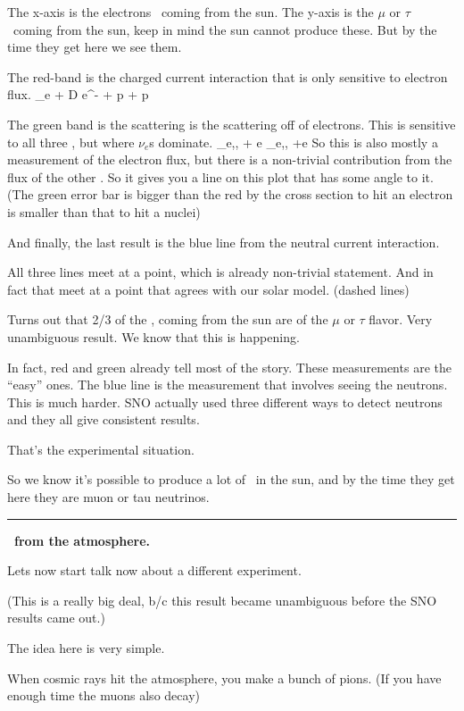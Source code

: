 {The x-axis is the electrons \nus\ coming from the sun. 
The y-axis is the $\mu$ or $\tau$ \nus\ coming from the sun, keep in mind the sun cannot produce these.
But by the time they get here we see them. 

The red-band is the charged current interaction that is only sensitive to electron flux. 
\be
\nu_e + D \rightarrow e^- + p + p
\ee 

The green band is the scattering is the scattering off of electrons.
This is sensitive to all three \nus, but where $\nu_e$s dominate.
\be
\nu_{e,\mu,\tau} + e  \rightarrow \nu_{e,\mu,\tau} +e
\ee
So this is also mostly a measurement of the electron flux, but there is a non-trivial contribution from the flux of the other \nus. 
So it gives you a line on this plot that has some angle to it. 
(The green error bar is bigger than the red by the cross section to hit an electron is smaller than that to hit a nuclei) 

And finally, the last result is the blue line from the neutral current interaction. 

All three lines meet at a point, which is already non-trivial statement. 
And in fact that meet at a point that agrees with our solar model. (dashed lines) 

Turns out that 2/3 of the \nus, coming from the sun are of the $\mu$ or $\tau$ flavor.
Very unambiguous result.
We know that this is happening.

In fact, red and green already tell most of the story. 
These measurements are the ``easy'' ones. 
The blue line is the measurement that involves seeing the neutrons. 
This is much harder. 
SNO actually used three different ways to detect neutrons and they all give consistent results. 

That's the experimental situation. 

So we know it's possible to produce a lot of \nus\ in the sun, and by the time they get here they are muon or tau neutrinos.

\noindent\rule{\textwidth}{1pt}

\textbf{\nus\ from the atmosphere.}

Lets now start talk now about a different experiment. 

(This is a really big deal, b/c this result became unambiguous before the SNO results came out.)

The idea here is very simple. 

When cosmic rays hit the atmosphere, you make a bunch of pions.  (If you have enough time the muons also decay) 

}
